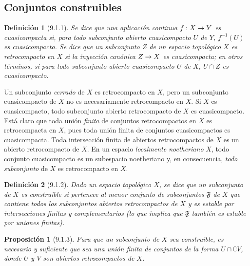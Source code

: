 \documentclass[10pt,oneside,openany]{book}
\theoremstyle{egaenv}\newtheorem*{env}{---}
\theoremstyle{egastatement}
\newtheorem*{proposition}{Proposición}
\theoremstyle{egadescription}
\newtheorem*{definition}{Definición}
\renewcommand{\to}{\mathchoice{\longrightarrow}{\rightarrow}{\rightarrow}{\rightarrow}}
\begin{document}
\subsection{Conjuntos construibles}
\label{subsection:0.9.1}
\label{subsection:0.9.1-fr}

\begin{definition}[9.1.1]
\label{0.9.1.1}
\label{0.9.1.1-fr}
Se dice que una aplicación continua $f:X\to Y$ es cuasicompacta si, para todo subconjunto abierto cuasicompacto $U$ de $Y$, $f^{-1}(U)$ es cuasicompacto.
Se dice que un subconjunto $Z$ de un espacio topológico $X$ es retrocompacto en $X$ si la inyección canónica $Z\to X$ es cuasicompacta; en otros términos, si para todo subconjunto abierto cuasicompacto $U$ de $X$, $U\cap Z$ es cuasicompacto.
\end{definition}

Un subconjunto \emph{cerrado} de $X$ es retrocompacto en $X$, pero un subconjunto cuasicompacto de $X$ no es necesariamente retrocompacto en $X$.
Si $X$ es cuasicompacto, todo subconjunto abierto retrocompacto de $X$ es cuasicompacto.
Está claro que toda unión \emph{finita} de conjuntos retrocompactos en $X$ es retrocompacta en $X$, pues toda unión finita de conjuntos cuasicompactos es cuasicompacta.
Toda intersección finita de abiertos retrocompactos de $X$ es un abierto retrocompacto de $X$.
En un espacio \emph{localmente noetheriano} $X$, todo conjunto cuasicompacto es un subespacio noetheriano y, en consecuencia, \emph{todo subconjunto} de $X$ es retrocompacto en $X$.

\begin{definition}[9.1.2]
\label{0.9.1.2}
\label{0.9.1.2-fr}
Dado un espacio topológico $X$, se dice que un subconjunto de $X$ es construible si pertenece al menor conjunto de subconjuntos $\mathfrak{F}$ de $X$ que contiene todos los subconjuntos abiertos retrocompactos de $X$ y es estable por intersecciones finitas y complementarios \textup{(lo que implica que $\mathfrak{F}$ también es} estable por uniones finitas\textup{)}.
\end{definition}

\begin{proposition}[9.1.3]
\label{0.9.1.3}
\label{0.9.1.3-fr}
Para que un subconjunto de $X$ sea construible, es necesario y suficiente que sea una unión finita de conjuntos de la forma $U\cap\complement{V}$, donde $U$ y $V$ son abiertos retrocompactos de $X$.
\end{proposition}
\end{document}
